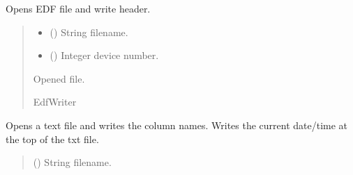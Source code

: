 \documentclass[letterpaper,10pt,english]{sphinxmanual}
\begin{document}
\begin{fulllineitems}
\begin{fulllineitems}
\end{fulllineitems}


\begin{fulllineitems}
\label{\detokenize{Setup_8401HR:Setup_8401HR.Setup_8401HR._OpenSaveFile_EDF}}
\pysigstartsignatures
{}
\pysigstopsignatures
\sphinxAtStartPar
Opens EDF file and write header.
\begin{quote}\begin{description}
\begin{itemize}
\item {} 
\sphinxAtStartPar
{} () \textendash{} String filename.

\item {} 
\sphinxAtStartPar
{} () \textendash{} Integer device number.

\end{itemize}

\sphinxAtStartPar
Opened file.

\sphinxAtStartPar
EdfWriter

\end{description}\end{quote}

\end{fulllineitems}


\begin{fulllineitems}
\label{\detokenize{Setup_8401HR:Setup_8401HR.Setup_8401HR._OpenSaveFile_TXT}}
\pysigstartsignatures
{}
\pysigstopsignatures
\sphinxAtStartPar
Opens a text file and writes the column names. Writes the current date/time at         the top of the txt file.
\begin{quote}\begin{description}
\sphinxAtStartPar
{} () \textendash{} String filename.


\end{description}
\end{quote}
\end{fulllineitems}
\end{fulllineitems}
\end{document}
